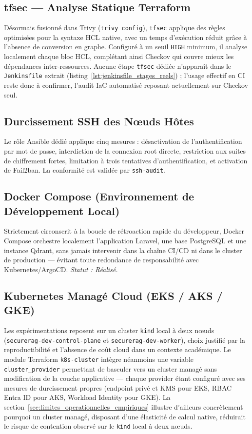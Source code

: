 \subsection{tfsec — Analyse Statique Terraform}
Désormais fusionné dans Trivy (\texttt{trivy config}), \texttt{tfsec} applique des règles optimisées pour la syntaxe HCL native, avec un temps d'exécution réduit grâce à l'absence de conversion en graphe. Configuré à un seuil \texttt{HIGH} minimum, il analyse localement chaque bloc HCL, complétant ainsi Checkov qui couvre mieux les dépendances inter-ressources. Aucune étape \texttt{tfsec} dédiée n'apparaît dans le \texttt{Jenkinsfile} extrait (listing~\ref{lst:jenkinsfile_stages_reels}) ; l'usage effectif en CI reste donc à confirmer, l'audit IaC automatisé reposant actuellement sur Checkov seul.

\subsection{Durcissement SSH des Nœuds Hôtes}
Le rôle Ansible dédié applique cinq mesures : désactivation de l'authentification par mot de passe, interdiction de la connexion root directe, restriction aux suites de chiffrement fortes, limitation à trois tentatives d'authentification, et activation de Fail2ban. La conformité est validée par \texttt{ssh-audit}.

\subsection{Docker Compose (Environnement de Développement Local)}
Strictement circonscrit à la boucle de rétroaction rapide du développeur, Docker Compose orchestre localement l'application Laravel, une base PostgreSQL et une instance Qdrant, sans jamais intervenir dans la chaîne CI/CD ni dans le cluster de production — évitant toute redondance de responsabilité avec Kubernetes/ArgoCD. \textit{Statut : Réalisé.}

\subsection{Kubernetes Managé Cloud (EKS / AKS / GKE)}
Les expérimentations reposent sur un cluster \texttt{kind} local à deux nœuds (\texttt{securerag-dev-control-plane} et \texttt{securerag-dev-worker}), choix justifié par la reproductibilité et l'absence de coût cloud dans un contexte académique. Le module Terraform \texttt{k8s-cluster} intègre néanmoins une variable \texttt{cluster\_provider} permettant de basculer vers un cluster managé sans modification de la couche applicative — chaque provider étant configuré avec ses mesures de durcissement propres (endpoint privé et KMS pour EKS, RBAC Entra ID pour AKS, Workload Identity pour GKE). La section~\ref{sec:limites_operationnelles_empiriques} illustre d'ailleurs concrètement pourquoi un cluster managé, disposant d'une élasticité de calcul native, réduirait le risque de contention observé sur le \texttt{kind} local à deux nœuds.

